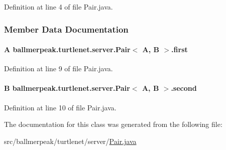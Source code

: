 Definition at line 4 of file Pair.\-java.



\subsubsection{Member Data Documentation}
\hypertarget{classballmerpeak_1_1turtlenet_1_1server_1_1Pair_3_01A_00_01B_01_4_a4e253f84c02d872c0a10e5f07af419ea}{
\paragraph[{first}]{\setlength{\rightskip}{0pt plus 5cm}A ballmerpeak.\-turtlenet.\-server.\-Pair$<$ A, B $>$.first}}\label{classballmerpeak_1_1turtlenet_1_1server_1_1Pair_3_01A_00_01B_01_4_a4e253f84c02d872c0a10e5f07af419ea}


Definition at line 9 of file Pair.\-java.

\hypertarget{classballmerpeak_1_1turtlenet_1_1server_1_1Pair_3_01A_00_01B_01_4_ac5d0c46e2e78cb5aa67fe6e3d1ee2add}{
\paragraph[{second}]{\setlength{\rightskip}{0pt plus 5cm}B ballmerpeak.\-turtlenet.\-server.\-Pair$<$ A, B $>$.second}}\label{classballmerpeak_1_1turtlenet_1_1server_1_1Pair_3_01A_00_01B_01_4_ac5d0c46e2e78cb5aa67fe6e3d1ee2add}


Definition at line 10 of file Pair.\-java.



The documentation for this class was generated from the following file\-:\begin{DoxyCompactItemize}
\item 
src/ballmerpeak/turtlenet/server/\hyperlink{Pair_8java}{Pair.\-java}\end{DoxyCompactItemize}

